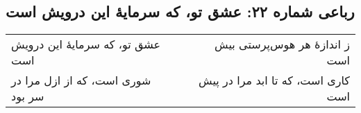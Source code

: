 \begin{center}
\section*{رباعی شماره ۲۲: عشق تو، که سرمایهٔ این درویش است}
\label{sec:022}
\begin{longtable}{l p{0.5cm} r}
عشق تو، که سرمایهٔ این درویش است
&&
ز اندازهٔ هر هوس‌پرستی بیش است
\\
شوری است، که از ازل مرا در سر بود
&&
کاری است، که تا ابد مرا در پیش است
\\
\end{longtable}
\end{center}

